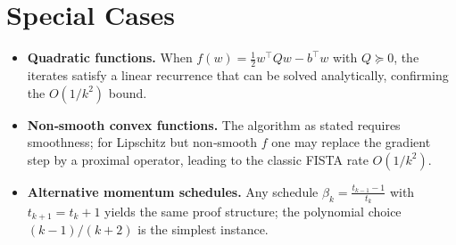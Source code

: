 \documentclass{article}
\begin{document}
\section*{Special Cases}
\begin{itemize}
\item \textbf{Quadratic functions.} When $f(w)=\frac12 w^\top Q w - b^\top w$ with $Q\succeq 0$, the iterates satisfy a linear recurrence that can be solved analytically, confirming the $O(1/k^2)$ bound.
\item \textbf{Non‑smooth convex functions.} The algorithm as stated requires smoothness; for Lipschitz but non‑smooth $f$ one may replace the gradient step by a proximal operator, leading to the classic FISTA rate $O(1/k^2)$.
\item \textbf{Alternative momentum schedules.} Any schedule $\beta_k=\frac{t_{k-1}-1}{t_k}$ with $t_{k+1}=t_k+1$ yields the same proof structure; the polynomial choice $(k-1)/(k+2)$ is the simplest instance.
\end{itemize}
\end{document}
